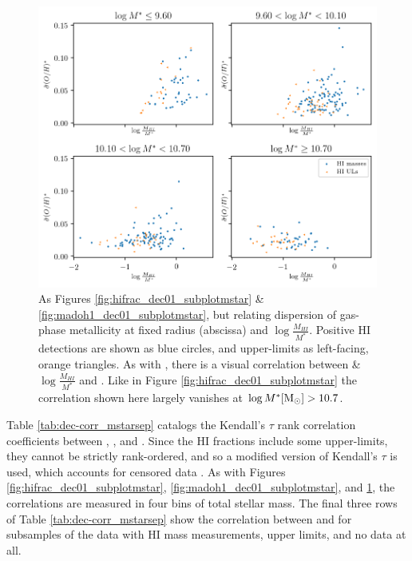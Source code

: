 \begin{figure}
    \centering
    \includegraphics[width=\textwidth]{hifrac_madoh1_subplotmstar}
    \caption[As Figures \ref{fig:hifrac_dec01_subplotmstar} \& \ref{fig:madoh1_dec01_subplotmstar}, but relating dispersion of gas-phase metallicity at fixed radius and .]{\fixspacing As Figures \ref{fig:hifrac_dec01_subplotmstar} \& \ref{fig:madoh1_dec01_subplotmstar}, but relating dispersion of gas-phase metallicity at fixed radius (abscissa) and $\log \frac{M_{HI}}{M^*}$. Positive HI detections are shown as blue circles, and upper-limits as left-facing, orange triangles. As with \metdec, there is a visual correlation between \& $\log \frac{M_{HI}}{M^*}$ and \metdisp. Like in Figure \ref{fig:hifrac_dec01_subplotmstar} the correlation shown here largely vanishes at $\log M^* {\rm [M_{\odot}]} > 10.7$.}
    \label{fig:madoh1_hifrac_subplotmstar}
\end{figure}

Table \ref{tab:dec-corr_mstarsep} catalogs the Kendall's $\tau$ rank correlation coefficients between \metdec, \metdisp, and \hifrac. Since the HI fractions include some upper-limits, they cannot be strictly rank-ordered, and so a modified version of Kendall's $\tau$ is used, which accounts for censored data \citep{akritas_murphy_lavalley_95, akritas_siebert_96, helsel_05_nondetects}. As with Figures \ref{fig:hifrac_dec01_subplotmstar}, \ref{fig:madoh1_dec01_subplotmstar}, and \ref{fig:madoh1_hifrac_subplotmstar}, the correlations are measured in four bins of total stellar mass. The final three rows of Table \ref{tab:dec-corr_mstarsep} show the correlation between \metdec and \metdisp for subsamples of the data with HI mass measurements, upper limits, and no data at all.

